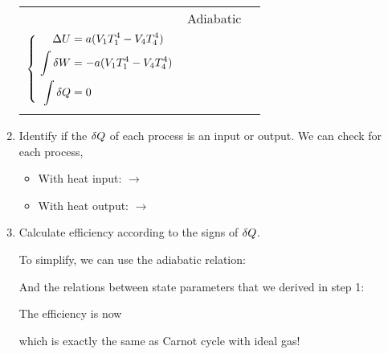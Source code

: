 \documentclass[class=article, crop=false, 12pt]{standalone}
\begin{document}
\begin{example}
\begin{enumerate}
\begin{center}
\begin{tabular}{>{\centering\arraybackslash}m{2cm} 
            >{\centering\arraybackslash}m{2.5cm} 
            c}
            & Adiabatic
            & \makecell[l]{
                \phantom{\scriptsize abc}\\
                $\left\{ \ \begin{aligned} 
                    \Delta U &= a(V_1T_1^4-V_4T_4^4)\\
                    \int \var{W} &= -a(V_1T_1^4-V_4T_4^4)\\
                    \int \var{Q} &= 0\\
                 \end{aligned}\right.$\\
                \phantom{\scriptsize abc}
            }
        \end{tabular}
    \end{center}

    \item Identify if the $\var{Q}$ of each process is an input or output.
    We can check for each process,
    \begin{itemize}
        \item With heat input:  $\rightarrow$ 
        \item With heat output:  $\rightarrow$ 
    \end{itemize}


    \item Calculate efficiency according to the signs of $\var{Q}$.

    To simplify, we can use the adiabatic relation:

    And the relations between state parameters that we derived in step 1:

    The efficiency is now

    which is exactly the same as Carnot cycle with ideal gas!

    \end{enumerate}

\end{example}




\theend
\end{document}
